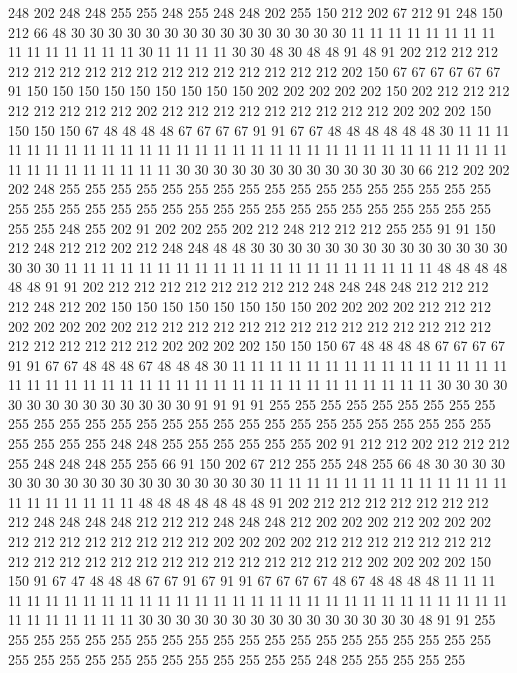 248 202 248 248 255 255 248 255 248 248 202 255 150 212 202 67 212 91 248 150
212 66 48 30 30 30 30 30 30 30 30 30 30 30 30 30 30 30 11 11
11 11 11 11 11 11 11 11 11 11 11 11 11 30 11 11 11 11 30 30
48 30 48 48 91 48 91 202 212 212 212 212 212 212 212 212 212 212 212 212
212 212 212 212 202 150 67 67 67 67 67 67 91 150 150 150 150 150 150 150
150 150 202 202 202 202 202 150 202 212 212 212 212 212 212 212 212 202 212 212
212 212 212 212 212 212 212 202 202 202 150 150 150 150 67 48 48 48 48 67
67 67 67 91 91 67 67 48 48 48 48 48 48 30 11 11 11 11 11 11
11 11 11 11 11 11 11 11 11 11 11 11 11 11 11 11 11 11 11 11
11 11 11 11 11 11 11 11 11 11 11 11 11 30 30 30 30 30 30 30
30 30 30 30 30 30 66 212 202 202 202 248 255 255 255 255 255 255 255 255
255 255 255 255 255 255 255 255 255 255 255 255 255 255 255 255 255 255 255 255
255 255 255 255 255 255 255 255 255 255 248 255 202 91 202 202 255 202 212 248
212 212 212 255 255 91 91 150 212 248 212 212 202 212 248 248 48 48 30 30
30 30 30 30 30 30 30 30 30 30 30 30 30 30 30 11 11 11 11 11
11 11 11 11 11 11 11 11 11 11 11 11 11 11 11 48 48 48 48 48
48 91 91 202 212 212 212 212 212 212 212 212 248 248 248 248 212 212 212 212
248 212 202 150 150 150 150 150 150 150 150 202 202 202 202 212 212 212 202 202
202 202 202 212 212 212 212 212 212 212 212 212 212 212 212 212 212 212 212 212
212 212 212 202 202 202 202 150 150 150 67 48 48 48 48 67 67 67 67 91
91 67 67 48 48 48 67 48 48 48 30 11 11 11 11 11 11 11 11 11
11 11 11 11 11 11 11 11 11 11 11 11 11 11 11 11 11 11 11 11
11 11 11 11 11 11 11 11 11 30 30 30 30 30 30 30 30 30 30 30
30 30 30 91 91 91 91 255 255 255 255 255 255 255 255 255 255 255 255 255
255 255 255 255 255 255 255 255 255 255 255 255 255 255 255 255 255 255 255 248
248 255 255 255 255 255 255 202 91 212 212 202 212 212 212 255 248 248 248 255
255 66 91 150 202 67 212 255 255 248 255 66 48 30 30 30 30 30 30 30
30 30 30 30 30 30 30 30 30 30 30 11 11 11 11 11 11 11 11 11
11 11 11 11 11 11 11 11 11 11 11 48 48 48 48 48 48 48 91 202
212 212 212 212 212 212 212 212 248 248 248 248 212 212 212 248 248 248 212 202
202 202 212 202 202 202 212 212 212 212 212 212 212 212 202 202 202 202 212 212
212 212 212 212 212 212 212 212 212 212 212 212 212 212 212 212 212 212 212 202
202 202 202 150 150 91 67 47 48 48 48 67 67 91 67 91 91 67 67 67
67 48 67 48 48 48 48 11 11 11 11 11 11 11 11 11 11 11 11 11
11 11 11 11 11 11 11 11 11 11 11 11 11 11 11 11 11 11 11 11
11 11 11 11 30 30 30 30 30 30 30 30 30 30 30 30 30 30 30 48
91 91 255 255 255 255 255 255 255 255 255 255 255 255 255 255 255 255 255 255
255 255 255 255 255 255 255 255 255 255 255 255 255 255 248 255 255 255 255 255

